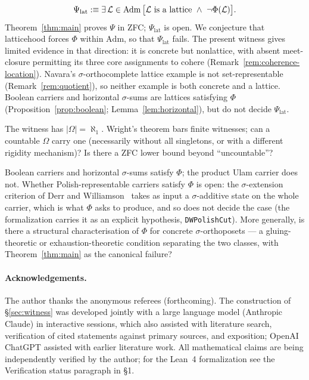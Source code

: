 \begin{question}\label{q:oml}
\[
  \Psi_{\mathrm{lat}} :\equiv \exists\,\mathcal{L}\in\mathrm{Adm}\,
  \bigl[\mathcal{L}\ \text{is a lattice}\ \wedge\ \neg\Phi(\mathcal{L})\bigr].
\]
Theorem~\ref{thm:main} proves $\Psi$ in ZFC; $\Psi_{\mathrm{lat}}$ is open. We
conjecture that latticehood forces $\Phi$ within $\mathrm{Adm}$, so that
$\Psi_{\mathrm{lat}}$ fails. The present witness gives limited evidence in that
direction: it is concrete but nonlattice, with absent meet-closure permitting
its three core assignments to cohere (Remark~\ref{rem:coherence-location}).
Navara's $\sigma$-orthocomplete lattice example is not set-representable
(Remark~\ref{rem:quotient}), so neither example is both concrete and a lattice.
Boolean carriers and horizontal $\sigma$-sums are lattices satisfying $\Phi$
(Proposition~\ref{prop:boolean}; Lemma~\ref{lem:horizontal}), but do not decide
$\Psi_{\mathrm{lat}}$.
\end{question}

\begin{question}[cardinality]\label{q:cardinality}
The witness has $|\Omega|=\aleph_1$. Wright's theorem bars finite witnesses;
can a countable $\Omega$ carry one (necessarily without all singletons, or with
a different rigidity mechanism)? Is there a ZFC lower bound beyond
``uncountable''?
\end{question}

\begin{question}\label{q:phi}
Boolean carriers and horizontal $\sigma$-sums satisfy $\Phi$; the product Ulam
carrier does not. Whether Polish-representable carriers satisfy $\Phi$ is open:
the $\sigma$-extension criterion of Derr and
Williamson~\cite[Thm.~D.6]{DerrWilliamson2023} takes as input a $\sigma$-additive
state on the whole carrier, which is what $\Phi$ asks to produce, and so does not
decide the case (the formalization carries it as an explicit hypothesis,
\texttt{DWPolishCut}). More generally, is there a structural
characterisation of $\Phi$ for concrete $\sigma$-orthoposets --- a
gluing-theoretic or exhaustion-theoretic condition separating the two classes,
with Theorem~\ref{thm:main} as the canonical failure?
\end{question}

\paragraph{Acknowledgements.}
The author thanks the anonymous referees (forthcoming). The construction of
\S\ref{sec:witness} was developed jointly with a large language model
(Anthropic Claude) in interactive sessions, which also assisted with literature
search, verification of cited statements against primary sources, and
exposition; OpenAI ChatGPT assisted with earlier literature work. All
mathematical claims are being independently verified by the author; for the
Lean~4 formalization see the Verification status paragraph in \S1.
